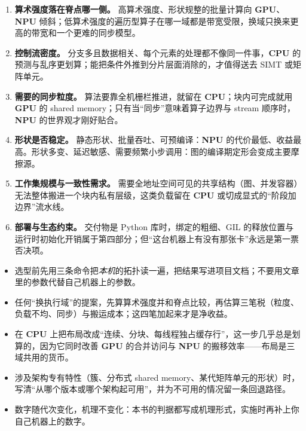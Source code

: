 \documentclass[12pt,a4paper,fontset=fandol]{ctexbook}
\newcommand{\Dom}[1]{\textsf{\bfseries #1}}
\newcommand{\CPU}{\Dom{CPU}}
\newcommand{\GPU}{\Dom{GPU}}
\newcommand{\NPU}{\Dom{NPU}}
\begin{document}
\begin{enumerate}
\item \textbf{算术强度落在脊点哪一侧。} 高算术强度、形状规整的批量计算向 \GPU{}、\NPU{} 倾斜；低算术强度的遍历型算子在哪一域都是带宽受限，换域只换来更高的带宽和一个更难的同步模型。
\item \textbf{控制流密度。} 分支多且数据相关、每个元素的处理都不像同一件事，\CPU{} 的预测与乱序更划算；能把条件外推到分片层面消除的，才值得送去 SIMT 或矩阵单元。
\item \textbf{需要的同步粒度。} 算法要靠全机栅栏推进，就留在 \CPU{}；块内可完成就用 \GPU{} 的 shared memory；只有当``同步''意味着算子边界与 stream 顺序时，\NPU{} 的世界观才刚好贴合。
\item \textbf{形状是否稳定。} 静态形状、批量吞吐、可预编译：\NPU{} 的代价最低、收益最高。形状多变、延迟敏感、需要频繁小步调用：图的编译期定形会变成主要摩擦源。
\item \textbf{工作集规模与一致性需求。} 需要全地址空间可见的共享结构（图、并发容器）无法整体搬进一个块内私有层级，这类负载留在 \CPU{} 或切成显式的``阶段加边界''流水线。
\item \textbf{部署与生态约束。} 交付物是 Python 库时，绑定的粗细、GIL 的释放位置与运行时初始化开销属于第四部分；但``这台机器上有没有那张卡''永远是第一票否决项。
\end{enumerate}

\begin{bestpractice}[title={画像使用规范}]
\begin{itemize}
\item 选型前先用三条命令把\emph{本机}的拓扑读一遍，把结果写进项目文档；不要用文章里的参数代替自己机器上的参数。
\item 任何``换执行域''的提案，先算算术强度并和脊点比较，再估算三笔税（粒度、负载不均、同步）与搬运成本；这四笔加起来才是净收益。
\item 在 \CPU{} 上把布局改成``连续、分块、每线程独占缓存行''，这一步几乎总是划算的，因为它同时改善 \GPU{} 的合并访问与 \NPU{} 的搬移效率——布局是三域共用的货币。
\item 涉及架构专有特性（簇、分布式 shared memory、某代矩阵单元的形状）时，写清``从哪个版本或哪个架构起可用''，并为不可用的情况留一条回退路径。
\item 数字随代次变化，机理不变化：本书的判据都写成机理形式，实施时再补上你自己机器上的数字。
\end{itemize}
\end{bestpractice}
\end{document}
